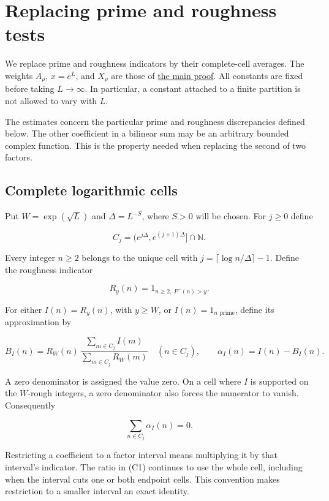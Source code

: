\hypertarget{correlation}{%
\section{Replacing prime and roughness tests}\label{correlation}}

We replace prime and roughness indicators by their complete-cell
averages. The weights \(A_\rho\), \(x=e^L\), and \(X_\rho\) are those of
\protect\hyperlink{proof}{the main proof}. All constants are fixed
before taking \(L\to\infty\). In particular, a constant attached to a
finite partition is not allowed to vary with \(L\).

The estimates concern the particular prime and roughness discrepancies
defined below. The other coefficient in a bilinear sum may be an
arbitrary bounded complex function. This is the property needed when
replacing the second of two factors.


\hypertarget{correlation-complete-logarithmic-cells}{%
\subsection{Complete logarithmic
cells}\label{correlation-complete-logarithmic-cells}}

Put \(W=\exp(\sqrt L)\) and \(\Delta=L^{-S}\), where \(S>0\) will be
chosen. For \(j\ge0\) define

\[
C_j=(e^{j\Delta},e^{(j+1)\Delta}]\cap\mathbb N.
\]

Every integer \(n\ge2\) belongs to the unique cell with
\(j=\lceil\log n/\Delta\rceil-1\). Define the roughness indicator

\[
R_y(n)=1_{n\ge2,\ P^-(n)>y}.
\]

For either \(I(n)=R_y(n)\), with \(y\ge W\), or
\(I(n)=1_{n\text{ prime}}\), define its approximation by

\[
B_I(n)=R_W(n)\,
 \frac{\sum_{m\in C_j}I(m)}{\sum_{m\in C_j}R_W(m)}
 \quad(n\in C_j),\qquad \alpha_I(n)=I(n)-B_I(n). \tag{C1}
\]

A zero denominator is assigned the value zero. On a cell where \(I\) is
supported on the \(W\)-rough integers, a zero denominator also forces
the numerator to vanish. Consequently

\[
\sum_{n\in C_j}\alpha_I(n)=0. \tag{C2}
\]

Restricting a coefficient to a factor interval means multiplying it by
that interval's indicator. The ratio in (C1) continues to use the whole
cell, including when the interval cuts one or both endpoint cells. This
convention makes restriction to a smaller interval an exact identity.

